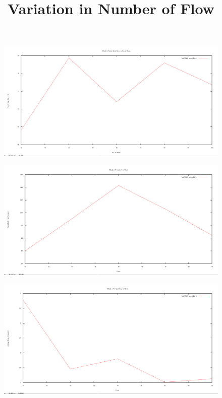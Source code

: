 \documentclass[12pt]{article}
\begin{document}
\begin{figure}[H]
	\centering
	\includegraphics[scale=	0.26]{image/802.15.4/Packetdropratio_vs_nodes.png}
\end{figure}


\newpage
\title{Variation in Number of Flow}
\begin{figure}[H]
	\centering
	\includegraphics[scale=	0.26]{image/802.15.4/Throughput_vs_flows.png}
\end{figure}

\begin{figure}[H]
	\centering
	\includegraphics[scale=	0.26]{image/802.15.4/Averagedelay_vs_flows.png}
\end{figure}
\end{document}
